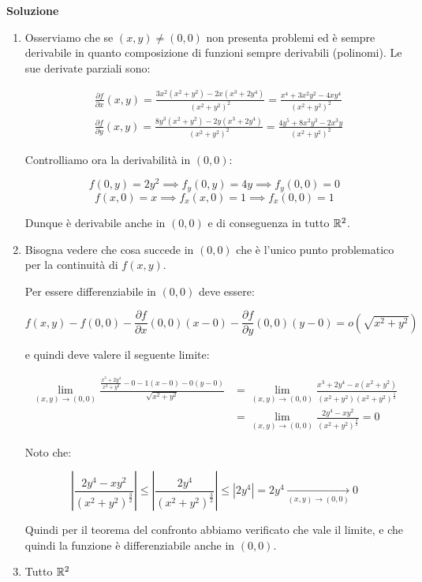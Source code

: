 \textbf{Soluzione}

\begin{enumerate}
    \item Osserviamo che se \((x,y) \neq (0,0)\) non presenta problemi ed è sempre derivabile in quanto composizione di funzioni sempre derivabili (polinomi). Le sue derivate parziali sono:

          \begin{align*}
               & \frac{\partial f}{\partial x}(x,y) = \frac{3x^{2}(x^{2}+y^{2})-2x(x^{3}+2y^{4})}{{(x^{2}+y^{2})}^{2}}= \frac{x^{4}+3x^{2}y^{2}-4xy^{4}}{{(x^{2}+y^{2})}^{2}}     \\[3mm]
               & \frac{\partial f}{\partial y}(x,y) = \frac{8y^{3}(x^{2}+y^{2}) - 2y(x^{3}+2y^{4})}{{(x^{2}+y^{2})}^{2}} = \frac{4y^{5}+8x^{2}y^{3}-2x^{3}y}{{(x^{2}+y^{2})}^{2}}
          \end{align*}

          Controlliamo ora la derivabilità in \((0,0)\):

          \[
              f(0,y) = 2y^{2} \implies f_y(0,y) = 4y \implies f_y(0,0) = 0
          \]
          \[
              f(x,0) = x \implies f_x(x,0) = 1 \implies f_x(0,0) = 1
          \]

          Dunque è derivabile anche in \((0,0)\) e di conseguenza in tutto \(\mathbb{R}^2\).

    \item Bisogna vedere che cosa succede in \((0,0)\) che è l'unico punto problematico per la continuità di \(f(x,y)\).

          Per essere differenziabile in \((0,0)\) deve essere:

          \[
              f(x,y) - f(0,0) - \frac{\partial f}{\partial x}(0,0) (x-0) - \frac{\partial f}{\partial y}(0,0) (y-0) = o\left( \sqrt{x^{2}+y^{2}} \right)
          \]

          e quindi deve valere il seguente limite:

          \begin{align*}
              \lim_{ (x,y) \to (0,0) } \frac{ \frac{x^{3}+2y^{4}}{x^{2}+y^{2}}-0 -1(x-0) -0(y-0)}{\sqrt{x^{2}+y^{2}}}
               & = \lim_{ (x,y) \to (0,0) } \frac{x^3+2y^{4}-x(x^2+y^2)}{(x^{2}+y^{2}) {(x^{2}+y^{2})}^{ \frac{1}{2}}} \\
               & = \lim_{ (x,y) \to (0,0) } \frac{2y^{4}-xy^{2}}{{(x^{2}+y^{2})}^{ \frac{3}{2}}}
              = 0
          \end{align*}

          Noto che:

          \[
              \left|\frac{2y^{4}-xy^{2}}{{(x^{2}+y^{2})}^{ \frac{3}{2}}}\right| \le \left|\frac{2y^{4}}{{(x^{2}+y^{2})}^{ \frac{3}{2}}}\right| \le \left|2y^{4}\right| = 2y^4 \xrightarrow[(x,y) \to (0,0)]{} 0
          \]

          Quindi per il teorema del confronto abbiamo verificato che vale il limite, e che quindi la funzione è differenziabile anche in \((0,0)\).
    \item Tutto \(\mathbb{R}^2\)
\end{enumerate}

